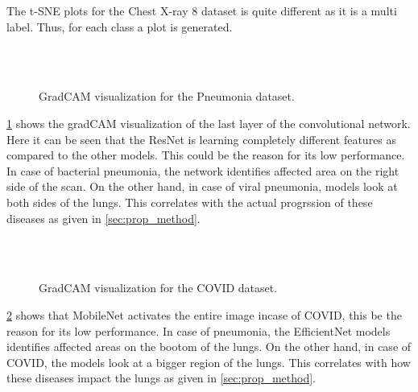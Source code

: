 \documentclass[10pt,twocolumn,letterpaper]{article}
\begin{document}
The t-SNE plots for the Chest X-ray 8 dataset is quite different as it is a multi label. Thus, for each class 
a plot is generated. 


\begin{figure}
  \\
  \\
  \caption{GradCAM visualization for the Pneumonia dataset.}
  \label{fig:gradcam_pneumonia}
\end{figure}

\cref{fig:gradcam_pneumonia} shows the gradCAM visualization of the last layer of the convolutional network.
Here it can be seen that the ResNet is learning completely different features as compared to the other 
models. This could be the reason for its low performance. In case of bacterial pneumonia, the network identifies 
affected area on the right side of the scan. On the other hand, in case of viral pneumonia, models look at both 
sides of the lungs. This correlates with the actual progrssion of these diseases as given in \cref{sec:prop_method}.



\begin{figure}
  \\
  \\
  \caption{GradCAM visualization for the COVID dataset.}
  \label{fig:gradcam_covid}
\end{figure}

\cref{fig:gradcam_covid} shows that MobileNet activates the entire image incase of COVID, this be the 
reason for its low performance. In case of pneumonia, the EfficientNet models identifies 
affected areas on the bootom of the lungs. On the other hand, in case of COVID, the models look at a bigger 
region of the lungs. This correlates with how these diseases impact the lungs as given in \cref{sec:prop_method}.
\end{document}
